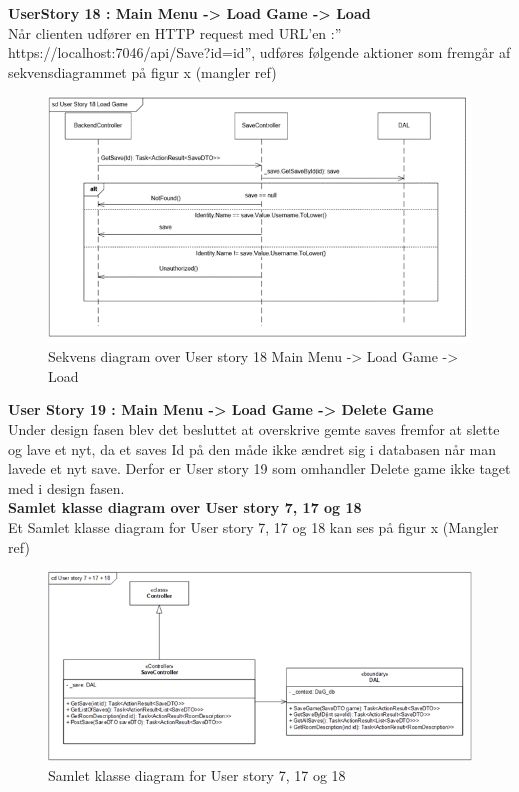 \textbf{UserStory 18 : Main Menu -> Load Game -> Load}\\
Når clienten udfører en HTTP request med URL’en :” https://localhost:7046/api/Save?id={id}”, udføres følgende aktioner som fremgår af sekvensdiagrammet på figur x (mangler ref)\\

\begin{figure}[h]
\centering
\includegraphics[width = \textwidth]{02-Body/Images/Backend_sekvens_18.PNG}
\caption{Sekvens diagram over User story 18 Main Menu -> Load Game -> Load}
\label{fig:Arkitektur-Backend-Sekvens-18}
\end{figure}

\textbf{User Story 19 : Main Menu -> Load Game -> Delete Game}\\

Under design fasen blev det besluttet at overskrive gemte saves fremfor at slette og lave et nyt, da et saves Id på den måde ikke ændret sig i databasen når man lavede et nyt save. Derfor er User story 19 som omhandler Delete game ikke taget med i design fasen.\\

\textbf{Samlet klasse diagram over User story 7, 17 og 18}\\
Et Samlet klasse diagram for User story 7, 17 og 18 kan ses på figur x (Mangler ref)\\

\begin{figure}[h]
\centering
\includegraphics[width = \textwidth]{02-Body/Images/Backend_klasse_7_17_18.PNG}
\caption{Samlet klasse diagram for User story 7, 17 og 18}
\label{fig:Arkitektur-Backend-Sekvens-7-17-18}
\end{figure}


